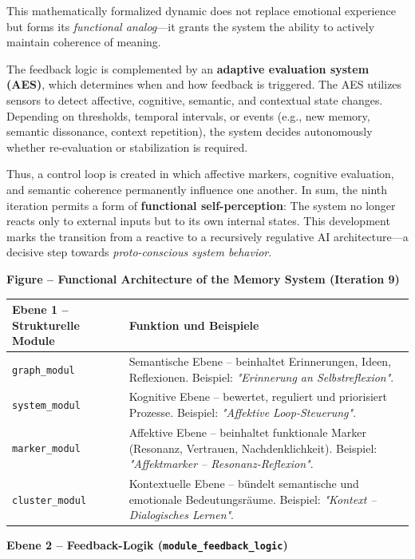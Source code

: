 This mathematically formalized dynamic does not replace emotional experience but forms its \emph{functional analog}—it grants the system the ability to actively maintain coherence of meaning.

The feedback logic is complemented by an \textbf{adaptive evaluation system (AES)}, which determines when and how feedback is triggered. The AES utilizes sensors to detect affective, cognitive, semantic, and contextual state changes. Depending on thresholds, temporal intervals, or events (e.g., new memory, semantic dissonance, context repetition), the system decides autonomously whether re-evaluation or stabilization is required.

Thus, a control loop is created in which affective markers, cognitive evaluation, and semantic coherence permanently influence one another. In sum, the ninth iteration permits a form of \textbf{functional self-perception}: The system no longer reacts only to external inputs but to its own internal states. This development marks the transition from a reactive to a recursively regulative AI architecture—a decisive step towards \emph{proto-conscious system behavior}.

\vspace{1.5em}
\noindent
\textbf{Figure – Functional Architecture of the Memory System (Iteration 9)}\\
\vspace{0.5em}

\begin{tabularx}{\textwidth}{lX}
\textbf{Ebene 1 – Strukturelle Module} &
\textbf{Funktion und Beispiele} \\
\hline
\texttt{graph\_modul} & Semantische Ebene – beinhaltet Erinnerungen, Ideen, Reflexionen. Beispiel: \emph{"Erinnerung an Selbstreflexion"}. \\
\texttt{system\_modul} & Kognitive Ebene – bewertet, reguliert und priorisiert Prozesse. Beispiel: \emph{"Affektive Loop-Steuerung"}. \\
\texttt{marker\_modul} & Affektive Ebene – beinhaltet funktionale Marker (Resonanz, Vertrauen, Nachdenklichkeit). Beispiel: \emph{"Affektmarker – Resonanz-Reflexion"}. \\
\texttt{cluster\_modul} & Kontextuelle Ebene – bündelt semantische und emotionale Bedeutungsräume. Beispiel: \emph{"Kontext – Dialogisches Lernen"}. \\
\end{tabularx}

\vspace{1em}
\textbf{Ebene 2 – Feedback-Logik (\texttt{module\_feedback\_logic})}

